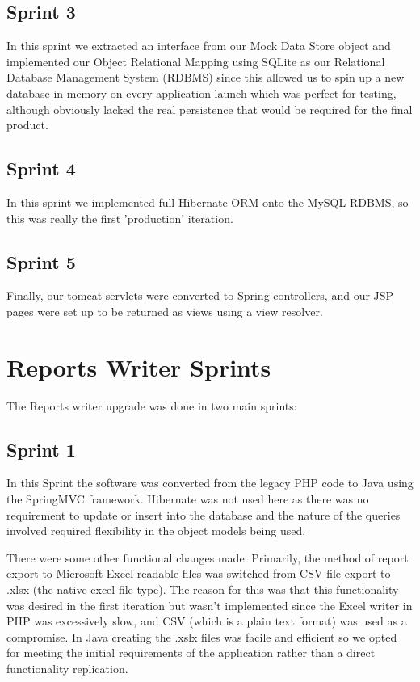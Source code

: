 \subsection{Sprint 3}
In this sprint we extracted an interface from our Mock Data Store object and implemented our Object Relational Mapping using SQLite as our Relational Database Management System (RDBMS) since this allowed us to spin up a new database in memory on every application launch which was perfect for testing, although obviously lacked the real persistence that would be required for the final product.

\subsection{Sprint 4}
In this sprint we implemented full Hibernate ORM onto the MySQL RDBMS, so this was really the first 'production' iteration.

\subsection{Sprint 5}
Finally, our tomcat servlets were converted to Spring controllers, and our JSP pages were set up to be returned as views using a view resolver. 

\section{Reports Writer Sprints}
The Reports writer upgrade was done in two main sprints:

\subsection{Sprint 1}
In this Sprint the software was converted from the legacy PHP code to Java using the SpringMVC framework. Hibernate was not used here as there was no requirement to update or insert into the database and the nature of the queries involved required flexibility in the object models being used.

There were some other functional changes made: Primarily, the method of report export to Microsoft Excel-readable files was switched from CSV file export to .xlsx (the native excel file type). The reason for this was that this functionality was desired in the first iteration but wasn't implemented since the Excel writer in PHP was excessively slow, and CSV (which is a plain text format) was used as a compromise. In Java creating the .xslx files was facile and efficient so we opted for meeting the initial requirements of the application rather than a direct functionality replication.

